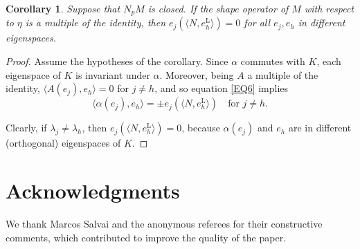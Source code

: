 \documentclass[a4paper,12pt,oneside]{amsart}
\theoremstyle{plain}
\newtheorem{corollary}[theorem]{Corollary}
\theoremstyle{remark}
\theoremstyle{definition}
\begin{document}
\begin{corollary}
Suppose that $N_{p}M$ is closed. If the shape operator of $M$ with respect to $\eta$ is a multiple of the identity, then $e_{j}(\langle N, e^{\mathrm{L}}_{h} \rangle) = 0$ for all $e_{j}, e_{h}$ in different eigenspaces.
\end{corollary}

\begin{proof}
Assume the hypotheses of the corollary. Since $\alpha$ commutes with $K$, each eigenspace of $K$ is invariant under $\alpha$. Moreover, being $A$ a multiple of the identity, $\langle A(e_{j}), e_{h} \rangle =0$ for $j \neq h$, and so equation \eqref{EQ6} implies 
\begin{equation*}
\langle \alpha(e_{j}), e_{h} \rangle = \pm e_{j}(\langle N,e^{\mathrm{L}}_{h}\rangle)\quad \text{for $j \neq h$}.
\end{equation*}

Clearly, if $\lambda_{j} \neq \lambda_{h}$, then $e_{j}(\langle N,e^{\mathrm{L}}_{h}\rangle)=0$, because $\alpha(e_{j})$ and $e_{h}$ are in different (orthogonal) eigenspaces of $K$.
\end{proof}

\section*{Acknowledgments}
We thank Marcos Salvai and the anonymous referees for their constructive comments, which contributed to improve the quality of the paper.



\end{document}
